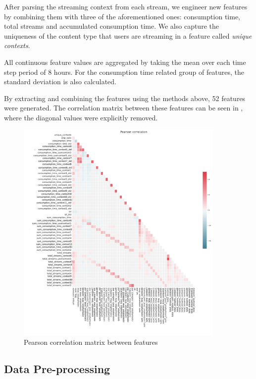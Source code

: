 \documentclass{kththesis}
\begin{document}
After parsing the streaming context from each stream, we engineer new features by combining them with three of the aforementioned ones: consumption time, total streams and accumulated consumption time. We also capture the uniqueness of the content type that users are streaming in a feature called \emph{unique contexts}.

All continuous feature values are aggregated by taking the mean over  each time step period of 8 hours. For the consumption time related group of features, the standard deviation is also calculated.

By extracting and combining the features using the methods above, 52 features were generated. The correlation matrix between these features can be seen in , where the diagonal values were explicitly removed.

	\begin{figure}[h]
    \centering
    \includegraphics[width=0.9\textwidth,height=0.9\textheight,keepaspectratio]{figures/corr.pdf}
    \caption{Pearson correlation matrix between features}
    \label{fig:correlation}
\end{figure}

\subsection{Data Pre-processing}
\end{document}
